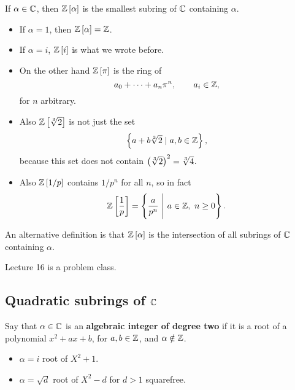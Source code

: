 \begin{definition}
If $ \alpha \in \mathbb{C} $, then $ \mathbb{Z}\left[ \alpha \right] $ is the smallest subring of $ \mathbb{C} $ containing $ \alpha $.
\end{definition}

\begin{example2}
\hfill
\begin{itemize}
\item If $ \alpha = 1 $, then $ \mathbb{Z}\left[ \alpha \right] = \mathbb{Z} $.
\item If $ \alpha = i $, $ \mathbb{Z}\left[ i \right] $ is what we wrote before.
\item On the other hand $ \mathbb{Z}\left[ \pi \right] $ is the ring of
$$ a_0 + \dots + a_n\pi^n, \qquad a_i \in \mathbb{Z}, $$
for $ n $ arbitrary.
\item Also $ \mathbb{Z}\left[ \sqrt[3]{2} \right] $ is not just the set
$$ \left\{ a + b\sqrt[3]{2} \mid a, b \in \mathbb{Z} \right\}, $$
because this set does not contain $ \left( \sqrt[3]{2} \right)^2 = \sqrt[3]{4} $.
\item Also $ \mathbb{Z}\left[ 1 / p \right] $ contains $ 1 / p^n $ for all $ n $, so in fact
$$ \mathbb{Z}\left[ \dfrac{1}{p} \right] = \left\{ \dfrac{a}{p^n} \ \Bigg| \ a \in \mathbb{Z}, \ n \ge 0 \right\}. $$
\end{itemize}
\end{example2}

An alternative definition is that $ \mathbb{Z}\left[ \alpha \right] $ is the intersection of all subrings of $ \mathbb{C} $ containing $ \alpha $.


Lecture 16 is a problem class.


\subsection{Quadratic subrings of $ \mathbb{C} $}

\begin{definition}
Say that $ \alpha \in \mathbb{C} $ is an \textbf{algebraic integer of degree two} if it is a root of a polynomial $ x^2 + ax + b $, for $ a, b \in \mathbb{Z} $, and $ \alpha \notin \mathbb{Z} $.
\end{definition}

\begin{example2}
\hfill
\begin{itemize}
\item $ \alpha = i $ root of $ X^2 + 1 $.
\item $ \alpha = \sqrt{d} $ root of $ X^2 - d $ for $ d > 1 $ squarefree.
\end{itemize}
\end{example2}

